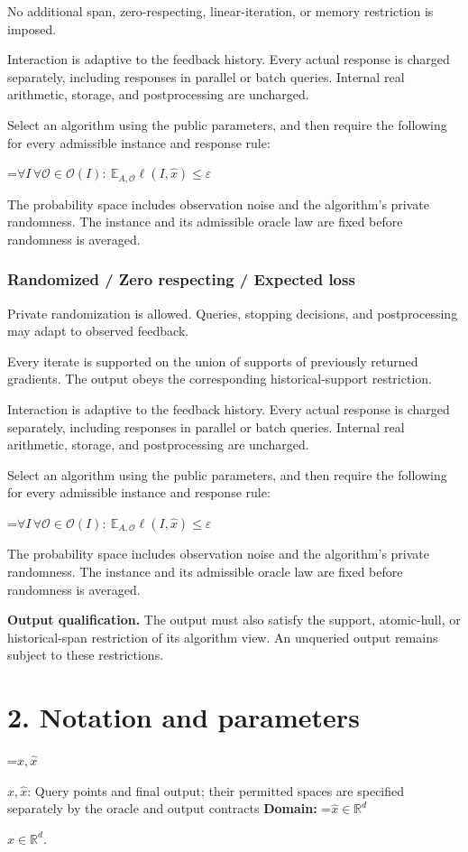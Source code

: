 \documentclass[10pt,a4paper]{article}
\newcommand{\AtlasMath}[1]{\par\begingroup\centering\setbox0=\hbox{$\displaystyle #1$}\ifdim\wd0>1.4\linewidth\typeout{ATLAS WIDE FORMULA: \the\wd0}\fi\ifdim\wd0>\linewidth\resizebox{\linewidth}{!}{\box0}\else\box0\fi\par\endgroup}
\newcommand{\AtlasInlineMath}[1]{\begingroup\setbox0=\hbox{$#1$}\ifdim\wd0>.4\linewidth\endgroup\AtlasMath{#1}\else\endgroup$#1$\fi}
\begin{document}
No additional span, zero-respecting, linear-iteration, or memory restriction is imposed.

Interaction is adaptive to the feedback history. Every actual response is charged separately, including responses in parallel or batch queries. Internal real arithmetic, storage, and postprocessing are uncharged.

Select an algorithm using the public parameters, and then require the following for every admissible instance and response rule:


\AtlasMath{\forall I\,\forall\mathcal{O}\in\mathcal{O}(I):\ \mathbb{E}_{A,\mathcal{O}}\ell(I,\widehat{x})\le\varepsilon}


The probability space includes observation noise and the algorithm's private randomness. The instance and its admissible oracle law are fixed before randomness is averaged.

\subsubsection{Randomized / Zero respecting / Expected loss}
Private randomization is allowed. Queries, stopping decisions, and postprocessing may adapt to observed feedback.

Every iterate is supported on the union of supports of previously returned gradients. The output obeys the corresponding historical-support restriction.

Interaction is adaptive to the feedback history. Every actual response is charged separately, including responses in parallel or batch queries. Internal real arithmetic, storage, and postprocessing are uncharged.

Select an algorithm using the public parameters, and then require the following for every admissible instance and response rule:


\AtlasMath{\forall I\,\forall\mathcal{O}\in\mathcal{O}(I):\ \mathbb{E}_{A,\mathcal{O}}\ell(I,\widehat{x})\le\varepsilon}


The probability space includes observation noise and the algorithm's private randomness. The instance and its admissible oracle law are fixed before randomness is averaged.

\textbf{Output qualification.} The output must also satisfy the support, atomic-hull, or historical-span restriction of its algorithm view. An unqueried output remains subject to these restrictions.

\section{2. Notation and parameters}
\AtlasInlineMath{x,\widehat{x}}: Query points and final output; their permitted spaces are specified separately by the oracle and output contracts \textbf{Domain:} \AtlasInlineMath{\widehat{x}\in \mathbb{R}^d}.
\end{document}
